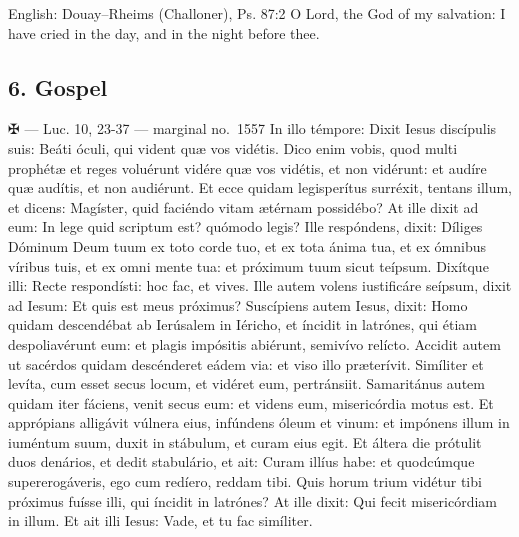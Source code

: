 \begin{namedtranslation}{English: Douay--Rheims (Challoner), Ps. 87:2}
O Lord, the God of my salvation: I have cried in the day, and in the night
before thee. 
\end{namedtranslation}

\elementguard
\subsection*{6. Gospel }

\begin{appointedlatin}{✠  --- Luc. 10, 23-37 --- marginal no.\ 1557}
In illo témpore: Dixit Iesus discípulis suis: Beáti óculi, qui vident quæ vos
vidétis. Dico enim vobis, quod multi prophétæ et reges voluérunt vidére quæ
vos vidétis, et non vidérunt: et audíre quæ audítis, et non audiérunt. Et ecce
quidam legisperítus surréxit, tentans illum, et dicens: Magíster, quid
faciéndo vitam ætérnam possidébo? At ille dixit ad eum: In lege quid scriptum
est? quómodo legis? Ille respóndens, dixit: Díliges Dóminum Deum tuum ex toto
corde tuo, et ex tota ánima tua, et ex ómnibus víribus tuis, et ex omni mente
tua: et próximum tuum sicut teípsum. Dixítque illi: Recte respondísti: hoc
fac, et vives. Ille autem volens iustificáre seípsum, dixit ad Iesum: Et quis
est meus próximus? Suscípiens autem Iesus, dixit: Homo quidam descendébat ab
Ierúsalem in Iéricho, et íncidit in latrónes, qui étiam despoliavérunt eum: et
plagis impósitis abiérunt, semivívo relícto. Accidit autem ut sacérdos quidam
descénderet eádem via: et viso illo præterívit. Simíliter et levíta, cum esset
secus locum, et vidéret eum, pertránsiit. Samaritánus autem quidam iter
fáciens, venit secus eum: et videns eum, misericórdia motus est. Et apprópians
alligávit vúlnera eius, infúndens óleum et vinum: et impónens illum in
iuméntum suum, duxit in stábulum, et curam eius egit. Et áltera die prótulit
duos denários, et dedit stabulário, et ait: Curam illíus habe: et quodcúmque
supererogáveris, ego cum redíero, reddam tibi. Quis horum trium vidétur tibi
próximus fuísse illi, qui íncidit in latrónes? At ille dixit: Qui fecit
misericórdiam in illum. Et ait illi Iesus: Vade, et tu fac simíliter.
\end{appointedlatin}


